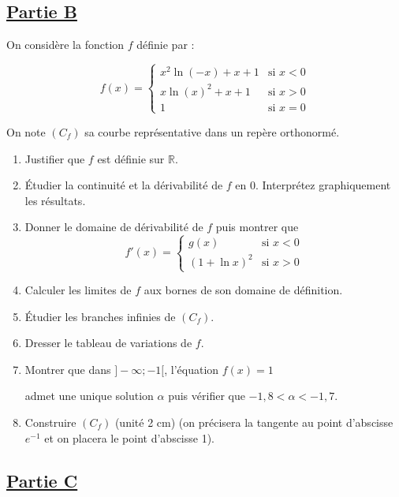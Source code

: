 \subsection*{\underline{\textbf{Partie B}}}

On considère la fonction \( f \) définie par :

\[
    f(x) =
    \begin{cases}
        x^2 \ln(-x) + x + 1 & \text{si } x < 0 \\
        x \ln(x)^2 + x + 1  & \text{si } x > 0 \\
        1                   & \text{si } x = 0
    \end{cases}
\]

On note \( (C_f) \) sa courbe représentative dans un repère orthonormé.

\begin{enumerate}
    \item Justifier que \( f \) est définie sur \( \mathbb{R} \).
    \item Étudier la continuité et la dérivabilité de \( f \) en 0. Interprétez graphiquement les résultats.
    \item Donner le domaine de dérivabilité de \( f \) puis montrer que
          \[
              f'(x) =
              \begin{cases}
                  g(x)          & \text{si } x < 0 \\
                  (1 + \ln x)^2 & \text{si } x > 0
              \end{cases}
          \]
    \item Calculer les limites de \( f \) aux bornes de son domaine de définition.
    \item Étudier les branches infinies de \( (C_f) \).
    \item Dresser le tableau de variations de \( f \).
    \item Montrer que dans \( ]-\infty; -1[ \), l’équation \( f(x) = 1 \)

          admet une unique solution \( \alpha \) puis vérifier que \(-1,8 < \alpha < -1,7\).
    \item Construire \( (C_f) \) (unité 2 cm) (on précisera la tangente au point d’abscisse \( e^{-1} \) et on placera le point d’abscisse 1).
\end{enumerate}

\subsection*{\underline{\textbf{Partie C}}}

